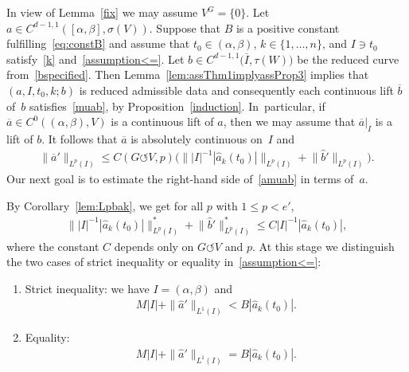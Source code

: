 \documentclass[11pt]{article}
\numberwithin{equation}{section}
\numberwithin{equation}{section}
\def\al{\alpha}
\def\be{\beta}
\def\si{\sigma}
\def\ta{\tau}
\def\ol{\overline}
\def\const{M}
\def\we{\hat}
\def\acts{\circlearrowleft}
\begin{document}
In view of Lemma~\ref{fix} we may assume $V^G = \{0\}$.
Let $a \in C^{d-1,1}([\al,\be],\si(V))$. Suppose that $B$ is a positive constant fulfilling~\eqref{eq:constB} and
assume that
$t_0 \in (\al,\be)$, $k \in \{1,\dots,n\}$, and $I \ni t_0$
satis\-fy~\eqref{k} and~\eqref{assumption<=}.
Let $b \in C^{d-1,1}\big(\overline I, \ta(W)\big)$ be the reduced curve from~\eqref{bspecified}.
Then Lemma~\ref{lem:assThm1implyassProp3} implies that $(a,I,t_0,k;b)$ is reduced admissible data and
consequently each continuous lift $\ol b$ of~$b$ satisfies~\eqref{muab}, by Proposition~\ref{induction}. In~particular, if~$\ol a \in C^0((\al,\be),V)$ is a continuous lift of $a$, then we may assume
that $\ol a|_I$ is a lift of $b$.
It follows that $\ol a$ is absolutely continuous on~$I$ and
\begin{gather} \label{amuab}
 	\|\ol a'\|_{L^p(I)} \le C(G \acts V,p) \Big( \big\| |I|^{-1} {|\we a_k(t_0)|} \big\|_{L^p (I)}
 + \big\|\we b'\big\|_{L^p (I)}\Big).
 \end{gather}
Our next goal is to estimate the right-hand side of~\eqref{amuab} in terms of~$a$.

By Corollary~\ref{lem:Lpbak},
we get for all $p$ with $1 \le p < e'$,
\begin{gather} \label{beforecases}
 \big\||I|^{-1} |\we a_k (t_0)| \big\|^*_{L^p (I)} + \big\|\we b'\big\|^*_{L^p(I)}
 \le C |I|^{-1} |\we a_k (t_0)|,
\end{gather}
where the constant $C$ depends only on $G \acts V$ and $p$.
At this stage we distinguish the two cases of strict inequality or equality in~\eqref{assumption<=}:
\begin{enumerate}
 \item[$(i)$] Strict inequality: we have $I = (\al,\be)$ and
 \begin{gather}\label{assumption<}
 \const |I| + \|\we a'\|_{L^1 (I)} < B |\we a_k(t_0)|.
 \end{gather}
 \item[$(ii)$] Equality:
 \begin{gather}\label{assumption=}
 \const |I| + \|\we a'\|_{L^1 (I)} = B |\we a_k(t_0)|.
 \end{gather}
\end{enumerate}
\end{document}
